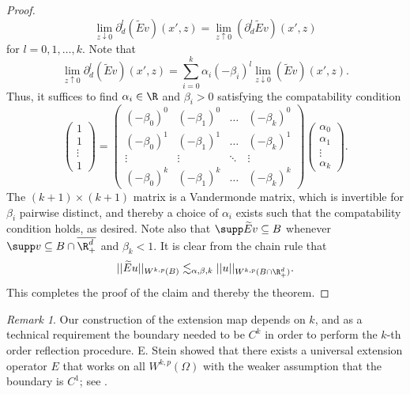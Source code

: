 \documentclass[reqno]{amsart}
\theoremstyle{definition}
\theoremstyle{remark}
\newtheorem*{remark}{Remark}
\begin{document}
\begin{proof}
		\[ \lim_{z \downarrow 0} \partial^l_d (\widetilde E v)(x', z) = \lim_{z \uparrow 0} (\partial^l_d \widetilde E v)(x', z)   \]
	for $l = 0, 1, \dots, k$.	Note that 
		\[ \lim_{z \uparrow 0} \partial^l_d (\widetilde E v) (x', z) = \sum_{i = 0}^k \alpha_i (-\beta_i)^l \lim_{z \downarrow 0}  (\widetilde E v)(x', z).   \]
	Thus, it suffices to find $\alpha_i \in \R$ and $\beta_i > 0$ satisfying the compatability condition
	\[
		\begin{pmatrix}
			1 \\
			1\\
			\vdots \\
			1
		\end{pmatrix}
		=
		\begin{pmatrix}
			(-\beta_0)^0 & (-\beta_1)^0 &\dots & (-\beta_k)^0 \\
			(-\beta_0)^1 &  (-\beta_1)^1 & \dots & (-\beta_k)^1 \\
			\vdots 			& \vdots  & \ddots & \vdots \\
			(-\beta_0)^k &  (-\beta_1)^k &\dots & (-\beta_k)^k
		\end{pmatrix}
		\begin{pmatrix}
			\alpha_0 \\
			\alpha_1\\
			\vdots \\
			\alpha_k
		\end{pmatrix}.
	\]	
	The $(k + 1) \times (k + 1)$ matrix is a Vandermonde matrix, which is invertible for $\beta_i$ pairwise distinct, and thereby a choice of $\alpha_i$ exists such that the compatability condition holds, as desired. Note also that $\supp \widetilde E v \subseteq B$ whenever $\supp v \subseteq B \cap \overline{\R^d_+}$ and $\beta_k < 1$. It is clear from the chain rule that 
		\[ ||\widetilde E u||_{W^{k, p} (B)} \lesssim_{\alpha, \beta, k} ||u||_{W^{k, p} (B \cap \R^d_+)}. \]
	This completes the proof of the claim and thereby the theorem. 	
\end{proof}

\begin{remark}
	Our construction of the extension map depends on $k$, and as a technical requirement the boundary needed to be $C^k$ in order to perform the $k$-th order reflection procedure. E. Stein showed that there exists a universal extension operator $E$ that works on all $W^{k, p} (\Omega)$ with the weaker assumption that the boundary is $C^1$; see \cite{Stein16}. 
\end{remark}
\end{document}
